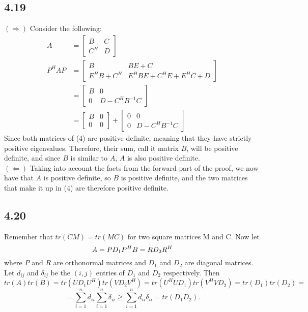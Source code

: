 \documentclass[letterpaper,12pt]{article}
\theoremstyle{definition}
\begin{document}
\subsection*{4.19}
$(\Rightarrow)$ Consider the following:
\begin{align}
A &= \begin{bmatrix}
B & C \\ 
C^H & D
\end{bmatrix}\\
P^HAP &= \begin{bmatrix}
B & BE + C \\
E^HB +C^H & E^HBE + C^HE + E^HC + D
\end{bmatrix}\\
&=\begin{bmatrix}
B & 0\\
0 & D - C^HB^{-1}C
\end{bmatrix}\\
&= \begin{bmatrix}
B&0\\
0 &0
\end{bmatrix}
+
\begin{bmatrix}
0&0\\
0 & D-C^HB^{-1}C
\end{bmatrix}
\end{align}
Since both matrices of (4) are positive definite, meaning that they have strictly positive eigenvalues. Therefore, their sum, call it matrix $B$, will be positive definite, and since $B$ is similar to $A$, $A$ is also positive definite.\\
$(\Leftarrow)$ Taking into account the facts from the forward part of the proof, we now have that $A$ is positive definite, so $B$ is positive definite, and the two matrices that make it up in (4) are therefore positive definite.


\subsection*{4.20}


Remember that $tr(CM) = tr(MC)$ for two square matrices M and C. Now let
\[A = PD_1P^H\\ 
B=RD_2R^H\] where $P$ and $R$ are orthonormal matrices and $D_1$ and $D_2$ are diagonal matrices. Let $d_{ij}$ and $\delta_{ij}$ be the $(i,j)$ entries of $D_1$ and $D_2$ respectively. Then 
\[tr(A)tr(B) = tr(UD_1U^H)tr(VD_2V^H) = tr(U^HUD_1)tr(V^HVD_2) = tr(D_1)tr(D_2) =\]
\[=\sum\limits_{i=1}^n d_{ii}\sum\limits_{i=1}^n \delta_{ii} \geq \sum\limits_{i=1}^{n}d_{ii}\delta_{ii} = tr(D_1D_2).\]
\end{document}

